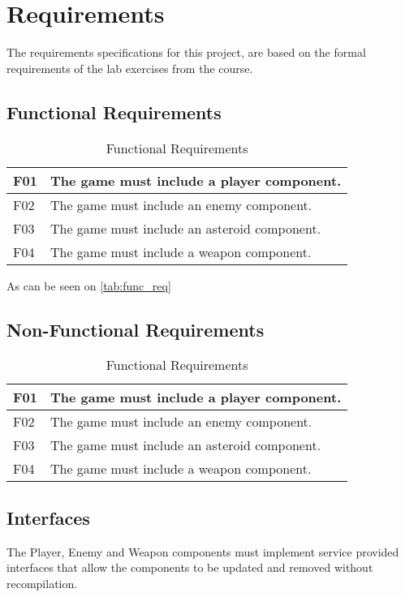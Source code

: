 \section{Requirements}
The requirements specifications for this project, are based on the formal requirements of
the lab exercises from the course.

\subsection{Functional Requirements}
\begin{table}
    \begin{center}
        \begin{tabulary}{1.0\textwidth}{l | L}
            \toprule
            F01 & The game must include a player component. \\
            \midrule
            F02 & The game must include an enemy component. \\
            \midrule
            F03 & The game must include an asteroid component. \\
            \midrule
            F04 & The game must include a weapon component. \\
            \bottomrule
        \end{tabulary}
    \end{center}
    \caption{Functional Requirements}
    \label{tab:func_req}
\end{table}

As can be seen on \autoref{tab:func_req}

\subsection{Non-Functional Requirements}
\begin{table}
    \begin{center}
        \begin{tabulary}{1.0\textwidth}{l | L}
            \toprule
            F01 & The game must include a player component. \\
            \midrule
            F02 & The game must include an enemy component. \\
            \midrule
            F03 & The game must include an asteroid component. \\
            \midrule
            F04 & The game must include a weapon component. \\
            \bottomrule
        \end{tabulary}
    \end{center}
    \caption{Functional Requirements}
    \label{tab:nfunc_req}
\end{table}
\subsection{Interfaces}


The Player, Enemy and Weapon components must implement service provided 
interfaces that allow the components to be updated and removed without 
recompilation.